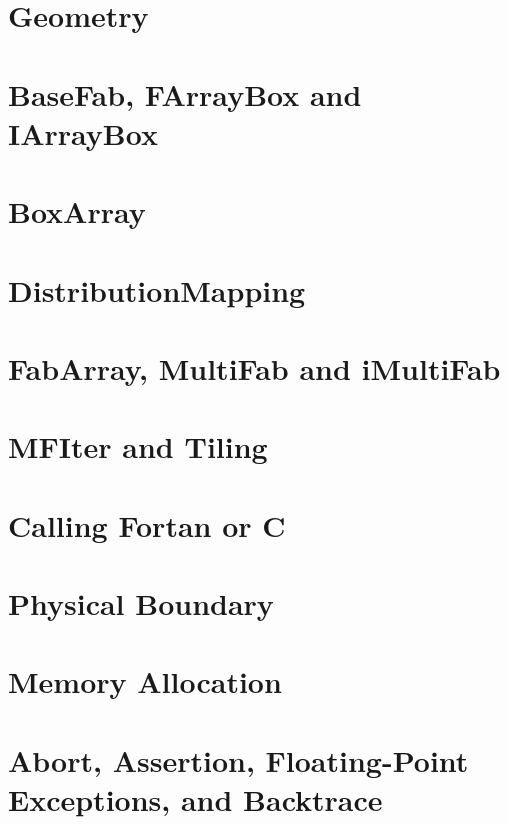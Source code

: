 
\section{Geometry}


\section{BaseFab, FArrayBox and IArrayBox}

\section{BoxArray}

\section{DistributionMapping}

\section{FabArray, MultiFab and iMultiFab}


\section{MFIter and Tiling}

\section{Calling Fortan or C}

\section{Physical Boundary}

\section{Memory Allocation}

\section{Abort, Assertion, Floating-Point Exceptions, and Backtrace}
